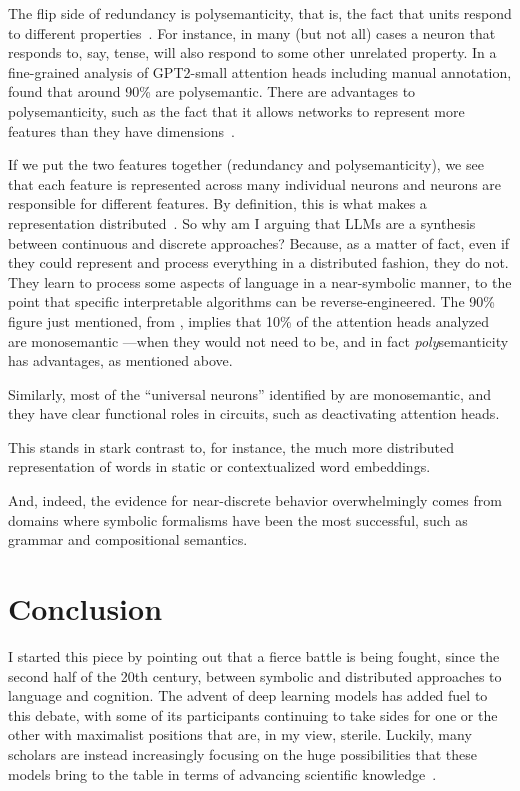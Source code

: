 The flip side of redundancy is polysemanticity, that is, the fact that units respond to different properties~\cite{rumelhart1986parallel}.
For instance, in many (but not all) cases a neuron that responds to, say, tense, will also respond to some other unrelated property.
In a fine-grained analysis of GPT2-small attention heads including manual annotation, \citet{krzyzanowski+24} found that around 90\% are polysemantic.
There are advantages to polysemanticity, such as the fact that it allows networks to represent more features than they have dimensions~\cite[][call this ``superposition'']{elhage2022superposition}.

If we put the two features together (redundancy and polysemanticity), we see that each feature is represented across many individual neurons and neurons are responsible for different features.
By definition, this is what makes a representation distributed~\cite{Hinton1986}.
So why am I arguing that LLMs are a synthesis between continuous and discrete approaches?
Because, as a matter of fact, even if they could represent and process everything in a distributed fashion, they do not. They learn to process some aspects of language in a near-symbolic manner, to the point that specific interpretable algorithms can be reverse-engineered.
The 90\% figure just mentioned, from \citet{krzyzanowski+24}, implies that 10\% of the attention heads analyzed are monosemantic ---when they would not need to be, and in fact \textit{poly}semanticity has advantages, as mentioned above.

Similarly, most of the ``universal neurons'' identified by \citet{gurnee2024universal} are monosemantic, and they have clear functional roles in circuits, such as deactivating attention heads.

This stands in stark contrast to, for instance, the much more distributed representation of words in static or contextualized word embeddings.

And, indeed, the evidence for near-discrete behavior overwhelmingly comes from domains where symbolic formalisms have been the most successful, such as grammar and compositional semantics.

\section{Conclusion}

I started this piece by pointing out that a fierce battle is being fought, since the second half of the 20th century, between symbolic and distributed approaches to language and cognition.
The advent of deep learning models has added fuel to this debate, with some of its participants continuing to take sides for one or the other with maximalist positions that are, in my view, sterile.
Luckily, many scholars are instead increasingly focusing on the huge possibilities that these models bring to the table in terms of advancing scientific knowledge~\cite{manning15,warstadt2022artificial,futrell2025linguisticslearnedstopworrying}.

